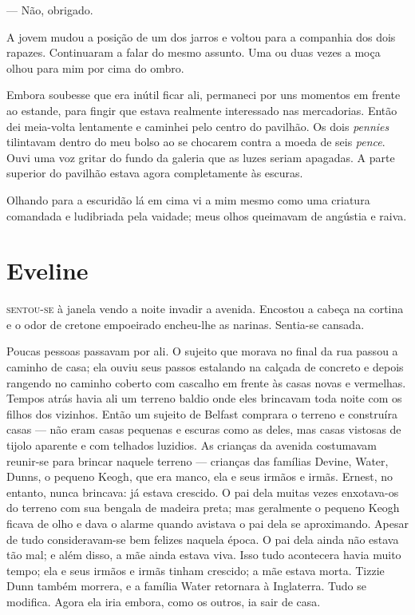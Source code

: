 --- Não, obrigado.

A jovem mudou a posição de um dos jarros e voltou para a companhia dos dois
rapazes.  Continuaram a falar do mesmo assunto.  Uma ou duas vezes a moça olhou
para mim por cima do ombro.

Embora soubesse que era inútil ficar ali, permaneci por uns momentos em frente
ao estande, para fingir que estava realmente interessado nas mercadorias.
Então dei meia-volta lentamente e caminhei pelo centro do pavilhão.  Os dois
\textit{pennies} tilintavam dentro do meu bolso ao se chocarem contra a moeda
de seis \textit{pence}.  Ouvi uma voz gritar do fundo da galeria que as luzes
seriam apagadas.  A parte superior do pavilhão estava agora completamente às
escuras.

Olhando para a escuridão lá em cima vi a mim mesmo como uma criatura comandada
e ludibriada pela vaidade; meus olhos queimavam de angústia e raiva.


\chapter{Eveline}

\textsc{sentou-se} à janela vendo a noite invadir a avenida.  Encostou a cabeça
na cortina e o odor de cretone empoeirado encheu-lhe as narinas.  Sentia-se
cansada.

Poucas pessoas passavam por ali.  O sujeito que morava no final da rua passou a
caminho de casa; ela ouviu seus passos estalando na calçada de concreto e
depois rangendo no caminho coberto com cascalho em frente às casas novas e
vermelhas.  Tempos atrás havia ali um terreno baldio onde eles brincavam toda
noite com os filhos dos vizinhos.  Então um sujeito de Belfast comprara o
terreno e construíra casas --- não eram casas pequenas e escuras como as deles,
mas casas vistosas de tijolo aparente e com telhados luzidios.  As crianças da
avenida costumavam reunir-se para brincar naquele terreno --- crianças das
famílias Devine, Water, Dunns, o pequeno Keogh, que era manco, ela e seus
irmãos e irmãs.  Ernest, no entanto, nunca brincava: já estava crescido.  O pai
dela muitas vezes enxotava-os do terreno com sua bengala de madeira preta; mas
geralmente o pequeno Keogh ficava de olho e dava o alarme quando avistava o pai
dela se aproximando.  Apesar de tudo consideravam-se bem felizes naquela época.
O pai dela ainda não estava tão mal; e além disso, a mãe ainda estava viva.
Isso tudo acontecera havia muito tempo; ela e seus irmãos e irmãs tinham
crescido; a mãe estava morta.  Tizzie Dunn também morrera, e a família Water
retornara à Inglaterra.  Tudo se modifica.  Agora ela iria embora, como os
outros, ia sair de casa.

